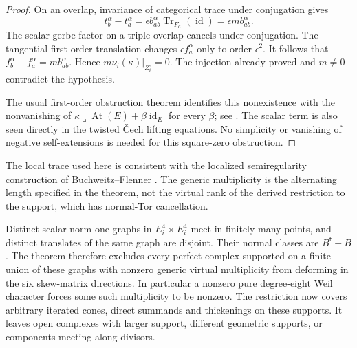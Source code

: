 \begin{proof}
On an overlap, invariance of categorical trace under conjugation gives
\[
 t_b^\alpha-t_a^\alpha
   =\epsilon b_{ab}^\alpha\operatorname{Tr}_{F_a}(\operatorname{id})
   =\epsilon m b_{ab}^\alpha.
\]
The scalar gerbe factor on a triple overlap cancels under conjugation.
The tangential first-order translation changes $\epsilon f_a^\alpha$
only to order $\epsilon^2$. It follows that
$f_b^\alpha-f_a^\alpha=m b_{ab}^\alpha$. Hence
$m\nu_i(\kappa)|_{Z_i^\circ}=0$. The injection already proved and $m\ne0$
contradict the hypothesis.

The usual first-order obstruction theorem identifies this
nonexistence with the nonvanishing of
$\kappa\mathbin{\lrcorner}\operatorname{At}(E)+\beta\operatorname{id}_E$
for every $\beta$; see \cite[Corollary~3.4]{HT}. The scalar term is also
seen directly in the twisted \v Cech lifting equations. No simplicity
or vanishing of negative self-extensions is needed for this square-zero
obstruction.
\end{proof}

The local trace used here is consistent with the localized
semiregularity construction of Buchweitz--Flenner
\cite[Remark~4.7(2), p.~170; Proposition~8.2 and formula~(3),
pp.~200--201]{BF}. The generic multiplicity is the alternating length
specified in the theorem, not the virtual rank of the derived
restriction to the support, which has normal-Tor cancellation.

Distinct scalar norm-one graphs in $E_i^4\times E_i^4$ meet in finitely many points, and distinct translates of the same graph are disjoint. Their normal classes are $B^{\mathsf t}-B$. The theorem therefore excludes every perfect complex supported on a finite union of these graphs with nonzero generic virtual multiplicity from deforming in the six skew-matrix directions. In particular a nonzero pure degree-eight Weil character forces some such multiplicity to be nonzero. The restriction now covers arbitrary iterated cones, direct summands and thickenings on these supports. It leaves open complexes with larger support, different geometric supports, or components meeting along divisors.
